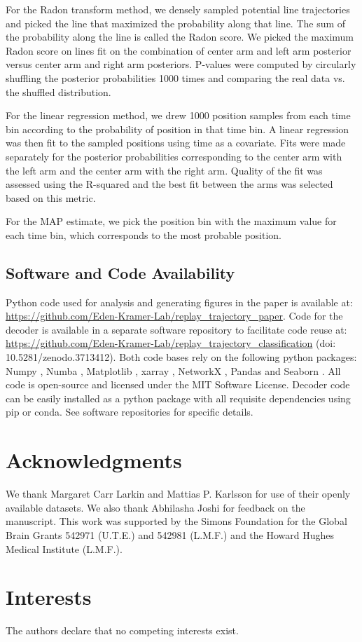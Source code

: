 \documentclass[9pt,lineno]{elife}
\begin{document}
For the Radon transform method, we densely sampled potential line trajectories and picked the line that maximized the probability along that line. The sum of the probability along the line is called the Radon score. We picked the maximum Radon score on lines fit on the combination of center arm and left arm posterior versus center arm and right arm posteriors. P-values were computed by circularly shuffling the posterior probabilities 1000 times and comparing the real data vs. the shuffled distribution.

For the linear regression method, we drew 1000 position samples from each time bin according to the probability of position in that time bin. A linear regression was then fit to the sampled positions using time as a covariate. Fits were made separately for the posterior probabilities corresponding to the center arm with the left arm and the center arm with the right arm. Quality of the fit was assessed using the R-squared and the best fit between the arms was selected based on this metric.

For the MAP estimate, we pick the position bin with the maximum value for each time bin, which corresponds to the most probable position.

\subsection*{Software and Code Availability}
Python code used for analysis and generating figures in the paper is available at: \url{https://github.com/Eden-Kramer-Lab/replay_trajectory_paper}. Code for the decoder is available in a separate software repository to facilitate code reuse at: \url{https://github.com/Eden-Kramer-Lab/replay_trajectory_classification} (doi: 10.5281/zenodo.3713412).
Both code bases rely on the following python packages: Numpy \citep{vanderWaltNumPyArrayStructure2011}, Numba \citep{LamNumbaLLVMbasedPython2015}, Matplotlib \citep{HunterMatplotlib2DGraphics2007}, xarray \citep{HoyerxarrayNDlabeled2017}, NetworkX \citep{HagbergExploringNetworkStructure2008}, Pandas \citep{McKinneyDataStructuresStatistical2010} and Seaborn \citep{Waskomseabornstatisticaldata2021}. All code is open-source and licensed under the MIT Software License. Decoder code can be easily installed as a python package with all requisite dependencies using pip or conda. See software repositories for specific details.

\section{Acknowledgments}
We thank Margaret Carr Larkin and Mattias P. Karlsson for use of their openly available datasets. We also thank Abhilasha Joshi for feedback on the manuscript. This work was supported by the Simons Foundation for the Global Brain Grants 542971 (U.T.E.) and 542981 (L.M.F.) and the Howard Hughes Medical Institute (L.M.F.).

\section{Interests}
The authors declare that no competing interests exist.


\end{document}
